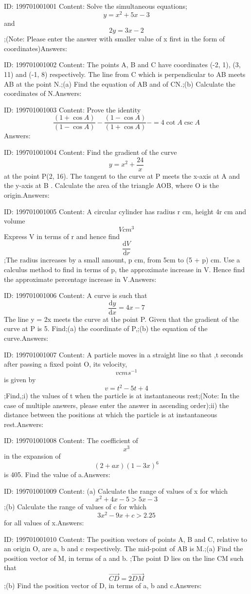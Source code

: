 \documentclass{article}
\begin{document}
ID: 199701001001
Content:
Solve the simultaneous equations;\[y=x^2+5x-3\] and \[2y=3x-2\];(Note: Please enter the answer with smaller value of x first in the form of coordinates)Answers:

ID: 199701001002
Content:
The points A, B and C have coordinates (-2, 1), (3, 11) and (-1, 8) respectively. The line from C which is perpendicular to AB meets AB at the point N.;(a)	Find the equation of AB and of CN.;(b)	Calculate the coordinates of N.Answers:

ID: 199701001003
Content:
Prove the identity \[\frac{(1+\cos A)}{(1-\cos A)}-\frac{(1-\cos A)}{(1+\cos A)}-=4\cot A \csc A\] Answers:

ID: 199701001004
Content:
Find the gradient of the curve \[y=x^2+\frac{24}{x}\] at the point P(2, 16). The tangent to the curve at P meets the x-axis at A and the y-axis at B . Calculate the area of the triangle AOB, where O is the origin.Answers:

ID: 199701001005
Content:
A circular cylinder has radius r cm, height 4r cm and volume \[V cm^3\] Express V in terms of r and hence find \[\frac{\mathrm{d} V}{\mathrm{d} r}\];The radius increases by a small amount, p cm, from 5cm to (5 + p) cm. Use a calculus method to find in terms of p, the approximate increase in V. Hence find the approximate percentage increase in V.Answers:

ID: 199701001006
Content:
A curve is such that \[\frac{\mathrm{d}y}{\mathrm{d} x}=4x-7\] The line y = 2x meets the curve at the point P. Given that the gradient of the curve at P is 5. Find;(a)	the coordinate of P,;(b)	the equation of the curve.Answers:

ID: 199701001007
Content:
A particle moves in a straight line so that ,t seconds after passing a fixed point O, its velocity, \[vcms^{-1}\] is given by \[v=t^2-5t+4\];Find,;i) the values of t when the particle is at instantaneous rest;(Note: In the case of multiple answers, please enter the answer in ascending order);ii) the distance between the positions at which the particle is at instantaneous rest.Answers:

ID: 199701001008
Content:
The coefficient of \[x^3\] in the expansion of \[(2+ax)(1-3x)^6\] is 405. Find the value of a.Answers:

ID: 199701001009
Content:
(a)	Calculate the range of values of x for which \[x^2+4x-5 > 5x-3\];(b)	Calculate the range of values of c for which \[3x^2-9x+c > 2.25\] for all values of x.Answers:

ID: 199701001010
Content:
The position vectors of points A, B and C, relative to an origin O, are a, b and c respectively. The mid-point of AB is M.;(a)	Find the position vector of M, in terms of a and b. ;The point D lies on the line CM such that \[\vec{CD}=2\vec{DM}\] ;(b)	Find the position vector of D, in terms of a, b and c.Answers:
\end{document}

